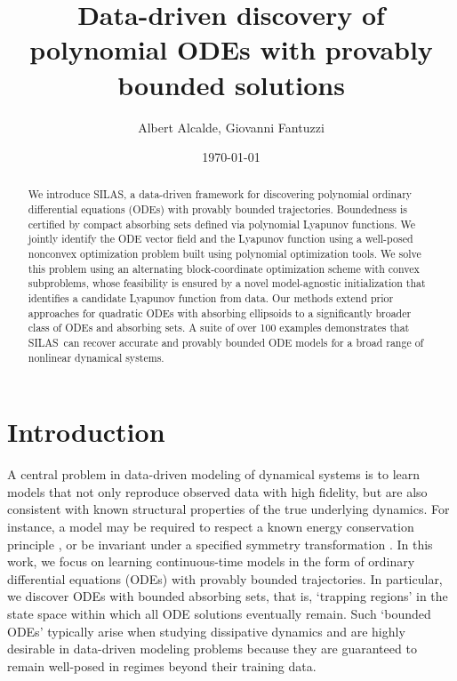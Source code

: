 \documentclass[11pt]{amsart}
\title[Data-driven discovery of bounded polynomial ODEs]{Data-driven discovery of polynomial ODEs with provably bounded solutions}
\author{Albert Alcalde, Giovanni Fantuzzi}
\date{\today}
\numberwithin{equation}{section}
\theoremstyle{plain}
\theoremstyle{definition}
\theoremstyle{remark}
\newcommand{\methodname}{{SILAS}}
\begin{document}
\begin{abstract}
We introduce \methodname, a data-driven framework for discovering polynomial ordinary differential equations (ODEs) with provably bounded trajectories. Boundedness is certified by compact absorbing sets defined via polynomial Lyapunov functions. We jointly identify the ODE vector field and the Lyapunov function using a well-posed nonconvex optimization problem built using polynomial optimization tools. We solve this problem using an alternating block-coordinate optimization scheme with convex subproblems, whose feasibility is ensured by a novel model-agnostic initialization that identifies a candidate Lyapunov function from data. Our methods extend prior approaches for quadratic ODEs with absorbing ellipsoids to a significantly broader class of ODEs and absorbing sets. A suite of over 100 examples demonstrates that \methodname\ can recover accurate and provably bounded ODE models for a broad range of nonlinear dynamical systems.
\end{abstract}

\maketitle

\section{Introduction}\label{s:intro}
A central problem in data-driven modeling of dynamical systems is to learn models that not only reproduce observed data with high fidelity, but are also consistent with known structural properties of the true underlying dynamics. For instance, a model may be required to respect a known energy conservation principle \cite{greydanus2019hamiltonian,doi:10.1073/pnas.1814058116}, or be invariant under a specified symmetry transformation \cite{bronstein2021geometric,otto2025unified}. In this work, we focus on learning continuous-time models in the form of ordinary differential equations (ODEs) with provably bounded trajectories. In particular, we discover ODEs with bounded absorbing sets, that is, `trapping regions' in the state space within which all ODE solutions eventually remain. Such `bounded ODEs' typically arise when studying dissipative dynamics and are highly desirable in data-driven modeling problems because they are guaranteed to remain well-posed in regimes beyond their training data. 
\end{document}
